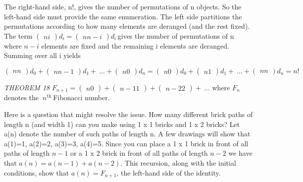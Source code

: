 \documentclass[10pt,letter]{article}
\begin{document}
The right-hand side, n!, gives the number of permutations of n objects.
So the left-hand side must provide the same enumeration. The left side
partitions the permutations according to how many elements are deranged
(and the rest fixed). The term \(\begin{pmatrix}
n
i
\end{pmatrix}
d_{i} =
\begin{pmatrix}
n
n - i
\end{pmatrix}
d_{\text{i\ }}\)gives the number of permutations of n where
\(n - i\) elements are fixed and the remaining i elements are deranged.
Summing over all i yields

\(\begin{pmatrix}
n
n
\end{pmatrix}
d_{0} +
\begin{pmatrix}
n
n - 1
\end{pmatrix}
d_{1} + \ \ldots +
\begin{pmatrix}
n
0
\end{pmatrix}
d_{n} =
\begin{pmatrix}
n
0
\end{pmatrix}
d_{0} +
\begin{pmatrix}
n
1
\end{pmatrix}
d_{1} + \ \ldots +
\begin{pmatrix}
n
n
\end{pmatrix}
d_{n} = n!\)

\emph{THEOREM 18} \(F_{n + 1} =
\begin{pmatrix}
n
0
\end{pmatrix}
 +
\begin{pmatrix}
n - 1
1
\end{pmatrix}
 +
\begin{pmatrix}
n - 2
2
\end{pmatrix}
 + \ \ldots\) where \(F_{n}\) denotes the
\(\ n^{\text{th}}\ \)Fibonacci number.

Here is a question that might resolve the issue. How many different
brick paths of length n (and width 1) can you make using 1 x 1 bricks
and 1 x 2 bricks? Let a(n) denote the number of such paths of length n.
A few drawings will show that a(1)=1, a(2)=2, a(3)=3, a(4)=5. Since you
can place a 1 x 1 brick in front of all paths of length \(n - 1\) or a 1
x 2 brick in front of all paths of length \(n - 2\) we have that
\(a\left( n \right) = a\left( n - 1 \right) + a\left( n - 2 \right)\).
This recursion, along with the initial conditions, show that
\(a\left( n \right) = F_{n + 1}\), the left-hand side of the identity.
\end{document}

